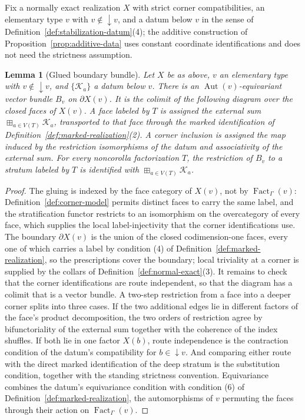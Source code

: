 \documentclass[11pt,letterpaper,twoside]{article}
\theoremstyle{plain}
\newtheorem{lemma}[theorem]{Lemma}
\theoremstyle{definition}
\theoremstyle{remark}
\newcommand{\below}[1]{{\downarrow}#1}
\DeclareMathOperator{\Fact}{Fact}
\begin{document}
Fix a normally exact realization \(X\) with strict corner compatibilities, an elementary type \(v\) with \(v\notin\below{v}\), and a datum below \(v\) in the sense of Definition~\ref{def:stabilization-datum}(4); the additive construction of Proposition~\ref{prop:additive-data} uses constant coordinate identifications and does not need the strictness assumption.

\begin{lemma}[Glued boundary bundle]\label{lem:glued-boundary}
Let \(X\) be as above, \(v\) an elementary type with \(v\notin \below{v}\), and \(\{\mathcal K_a\}\) a datum below \(v\).  There is an \(\operatorname{Aut}(v)\)-equivariant vector bundle \(B_v\) on \(\partial X(v)\).  It is the colimit of the following diagram over the closed faces of \(X(v)\).  A face labeled by \(T\) is assigned the external sum \(\boxplus_{a\in V(T)}\mathcal K_a\), transported to that face through the marked identification of Definition~\ref{def:marked-realization}(2).  A corner inclusion is assigned the map induced by the restriction isomorphisms of the datum and associativity of the external sum.  For every noncorolla factorization \(T\), the restriction of \(B_v\) to a stratum labeled by \(T\) is identified with \(\boxplus_{a\in V(T)}\mathcal K_a\).
\end{lemma}

\begin{proof}
The gluing is indexed by the face category of \(X(v)\), not by \(\Fact_\Gamma(v)\): Definition~\ref{def:corner-model} permits distinct faces to carry the same label, and the stratification functor restricts to an isomorphism on the overcategory of every face, which supplies the local label-injectivity that the corner identifications use.  The boundary \(\partial X(v)\) is the union of the closed codimension-one faces, every one of which carries a label by condition (4) of Definition~\ref{def:marked-realization}, so the prescriptions cover the boundary; local triviality at a corner is supplied by the collars of Definition~\ref{def:normal-exact}(3).  It remains to check that the corner identifications are route independent, so that the diagram has a colimit that is a vector bundle.  A two-step restriction from a face into a deeper corner splits into three cases.  If the two additional edges lie in different factors of the face's product decomposition, the two orders of restriction agree by bifunctoriality of the external sum together with the coherence of the index shuffles.  If both lie in one factor \(X(b)\), route independence is the contraction condition of the datum's compatibility for \(b\in \below{v}\).  And comparing either route with the direct marked identification of the deep stratum is the substitution condition, together with the standing strictness convention.  Equivariance combines the datum's equivariance condition with condition (6) of Definition~\ref{def:marked-realization}, the automorphisms of \(v\) permuting the faces through their action on \(\Fact_\Gamma(v)\).
\end{proof}
\end{document}
